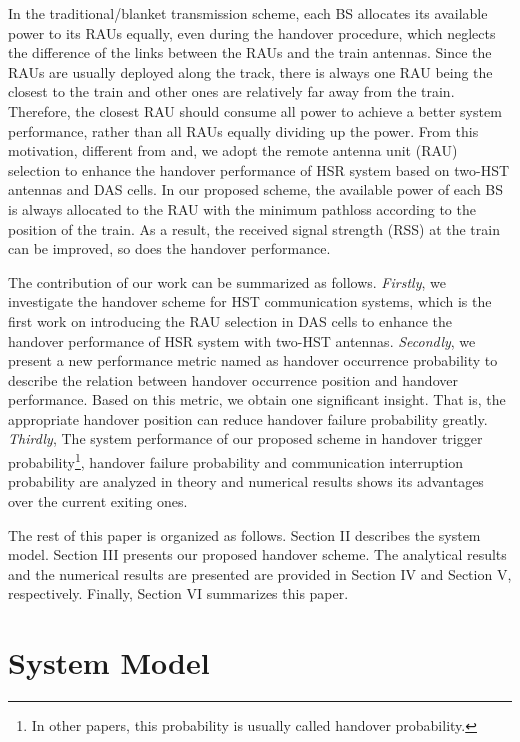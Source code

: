 \documentclass[a4paper,twocolumn,10pt]{IEEEtran}
\begin{document}
In the traditional/blanket transmission scheme, each BS allocates its available power to its RAUs equally, even during the handover procedure, which neglects the difference of the links between the RAUs and the train antennas. Since the RAUs are usually deployed along the track, there is always one RAU being the closest to the train and other ones are relatively far away from the train. Therefore, the closest RAU should consume all power to achieve a better system performance, rather than all RAUs equally dividing up the power. From this motivation, different from\textcolor[rgb]{0,0,0}{\cite{DualA}} and\textcolor[rgb]{0,0,0}{\cite{DualB}}, we adopt the remote antenna unit (RAU) selection to enhance the handover performance of HSR system based on two-HST antennas and DAS cells.
In our proposed scheme, the available power of each BS is always allocated to the RAU with the minimum pathloss according to the position of the train. As a result, the received signal strength (RSS) at the train can be improved, so does the handover performance.

The contribution of our work can be summarized as follows. \textit{Firstly}, we investigate the handover scheme for HST communication systems,
 which is the first work on introducing the RAU selection in DAS cells to enhance the handover performance of HSR system with two-HST antennas.
  \textit{Secondly}, we present a new performance metric named as handover occurrence probability to describe the relation between handover occurrence
  position and handover performance. Based on this metric, we obtain one significant insight. \textcolor[rgb]{0.00,0.00,0.00}{That is, the appropriate
  handover position can reduce handover failure probability greatly.} \textit{Thirdly}, The system performance of our proposed scheme in handover trigger
  probability\footnote{In other papers, this probability is usually called handover probability.}, handover failure probability and communication interruption
   probability are analyzed in theory and numerical results shows its advantages over the current exiting ones.


The rest of this paper is organized as follows. Section II describes the system model. Section III presents our proposed handover scheme. The analytical results and the numerical results are presented are provided in Section IV and Section V, respectively. Finally, Section VI summarizes this paper.

\section{System Model}
\end{document}
